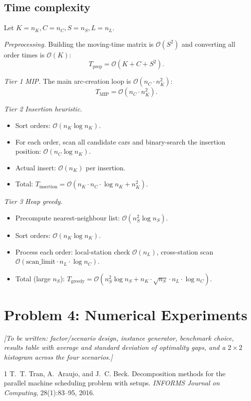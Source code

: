 \documentclass[a4paper, 12pt]{article}
\begin{document}
\subsection{Time complexity}

Let $K = n_K, C = n_C, S = n_S, L = n_L$.

\smallskip
\noindent\textit{Preprocessing.} Building the moving-time matrix is $\mathcal{O}(S^2)$ and converting all order times is $\mathcal{O}(K)$:
\[ T_{\text{prep}} = \mathcal{O}(K + C + S^2). \]

\noindent\textit{Tier 1 MIP.} The main arc-creation loop is $\mathcal{O}(n_C\cdot n_K^2)$:
\[ T_{\text{MIP}} = \mathcal{O}(n_C\cdot n_K^2). \]

\noindent\textit{Tier 2 Insertion heuristic.}
\begin{itemize}
    \item Sort orders: $\mathcal{O}(n_K\log n_K)$.
    \item For each order, scan all candidate cars and binary-search the insertion position: $\mathcal{O}(n_C\log n_K)$.
    \item Actual insert: $\mathcal{O}(n_K)$ per insertion.
    \item Total: $T_{\text{insertion}} = \mathcal{O}(n_K\cdot n_C\cdot \log n_K + n_K^2)$.
\end{itemize}

\noindent\textit{Tier 3 Heap greedy.}
\begin{itemize}
    \item Precompute nearest-neighbour list: $\mathcal{O}(n_S^2\log n_S)$.
    \item Sort orders: $\mathcal{O}(n_K\log n_K)$.
    \item Process each order: local-station check $\mathcal{O}(n_L)$, cross-station scan $\mathcal{O}(\text{scan\_limit}\cdot n_L\cdot \log n_C)$.
    \item Total (large $n_S$): $T_{\text{greedy}} = \mathcal{O}(n_S^2\log n_S + n_K\cdot \sqrt{n_S}\cdot n_L\cdot \log n_C)$.
\end{itemize}

\section{Problem 4: Numerical Experiments}\label{sec:p4}

\emph{[To be written: factor/scenario design, instance generator, benchmark choice,
results table with average and standard deviation of optimality gaps, and a
$2\times 2$ histogram across the four scenarios.]}


\begin{thebibliography}{1}
 T.~T. Tran, A.~Araujo, and J.~C. Beck. Decomposition methods for the parallel machine scheduling problem with setups. \emph{INFORMS Journal on Computing}, 28(1):83--95, 2016.
\end{thebibliography}
\end{document}
